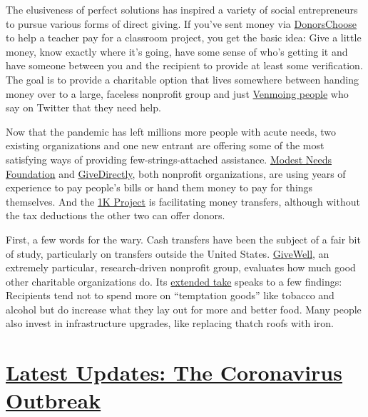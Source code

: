 The elusiveness of perfect solutions has inspired a variety of social
entrepreneurs to pursue various forms of direct giving. If you've sent
money via \href{https://www.donorschoose.org/about}{DonorsChoose} to
help a teacher pay for a classroom project, you get the basic idea: Give
a little money, know exactly where it's going, have some sense of who's
getting it and have someone between you and the recipient to provide at
least some verification. The goal is to provide a charitable option that
lives somewhere between handing money over to a large, faceless
nonprofit group and just
\href{https://www.nytimes3xbfgragh.onion/2020/03/16/business/coronavirus-bills-charity.html}{Venmoing
people} who say on Twitter that they need help.

Now that the pandemic has left millions more people with acute needs,
two existing organizations and one new entrant are offering some of the
most satisfying ways of providing few-strings-attached assistance.
\href{https://www.modestneeds.org/}{Modest Needs Foundation} and
\href{https://www.givedirectly.org/}{GiveDirectly}, both nonprofit
organizations, are using years of experience to pay people's bills or
hand them money to pay for things themselves. And the
\href{https://www.1kproject.org/}{1K Project} is facilitating money
transfers, although without the tax deductions the other two can offer
donors.

First, a few words for the wary. Cash transfers have been the subject of
a fair bit of study, particularly on transfers outside the United
States. \href{https://www.givewell.org/about}{GiveWell}, an extremely
particular, research-driven nonprofit group, evaluates how much good
other charitable organizations do. Its
\href{https://www.givewell.org/international/technical/programs/cash-transfers}{extended
take} speaks to a few findings: Recipients tend not to spend more on
``temptation goods'' like tobacco and alcohol but do increase what they
lay out for more and better food. Many people also invest in
infrastructure upgrades, like replacing thatch roofs with iron.

\hypertarget{latest-updates-the-coronavirus-outbreak}{%
\section{\texorpdfstring{\href{https://www.nytimes3xbfgragh.onion/2020/08/21/world/covid-19-coronavirus.html?action=click\&pgtype=Article\&state=default\&region=MAIN_CONTENT_1\&context=storylines_live_updates}{Latest
Updates: The Coronavirus
Outbreak}}{Latest Updates: The Coronavirus Outbreak}}\label{latest-updates-the-coronavirus-outbreak}}

